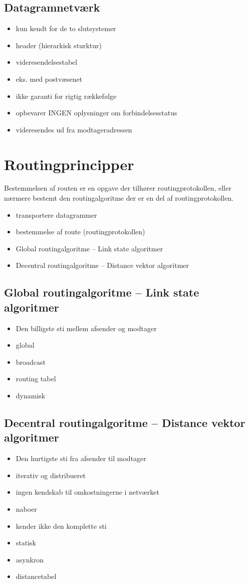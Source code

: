 \subsection{Datagramnetværk}
\begin{itemize}
	\item kun kendt for de to slutsystemer
	\item header (hierarkisk sturktur) 
	\item videresendelsestabel
	\item eks. med postvæsenet
	\item ikke garanti for rigtig rækkefølge
	\item opbevarer INGEN oplysninger om forbindelsesstatus
	\item videresendes ud fra modtageradressen
\end{itemize}

\section{Routingprincipper}
Bestemmelsen af routen er en opgave der tilhører routingprotokollen, eller nærmere bestemt den routingalgoritme der er en del af routingprotokollen.
\begin{itemize}
	\item transportere datagrammer
	\item bestemmelse af route (routingprotokollen)
	\item Global routingalgoritme – Link state algoritmer
	\item Decentral routingalgoritme – Distance vektor algoritmer
\end{itemize}

\subsection{Global routingalgoritme – Link state algoritmer}
\begin{itemize}
	\item Den billigste sti mellem afsender og modtager
	\item global
	\item broadcast
	\item routing tabel
	\item dynamisk
\end{itemize}

\subsection{Decentral routingalgoritme – Distance vektor algoritmer}
\begin{itemize}
	\item Den hurtigste sti fra afsender til modtager
	\item iterativ og distribueret
	\item ingen kendskab til omkostningerne i netværket
	\item naboer
	\item kender ikke den komplette sti
	\item statisk
	\item asynkron
	\item distancetabel
\end{itemize}

